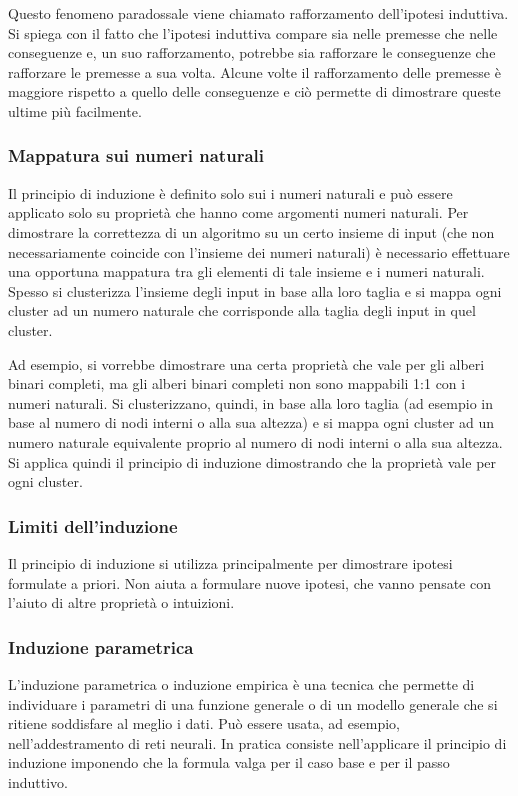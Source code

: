 Questo fenomeno paradossale viene chiamato rafforzamento dell'ipotesi induttiva. Si spiega con il fatto che l'ipotesi
induttiva compare sia nelle premesse che nelle conseguenze e, un suo rafforzamento, potrebbe sia rafforzare le conseguenze
che rafforzare le premesse a sua volta. Alcune volte il rafforzamento delle premesse è maggiore rispetto a quello delle
conseguenze e ciò permette di dimostrare queste ultime più facilmente.

\subsubsection*{Mappatura sui numeri naturali}
Il principio di induzione è definito solo sui i numeri naturali e può essere applicato solo su proprietà che hanno come
argomenti numeri naturali. Per dimostrare la correttezza di un algoritmo su un certo insieme di input (che non necessariamente
coincide con l'insieme dei numeri naturali) è necessario effettuare una opportuna mappatura tra gli elementi di tale insieme
e i numeri naturali. Spesso si clusterizza l'insieme degli input in base alla loro taglia e si mappa ogni cluster ad un numero
naturale che corrisponde alla taglia degli input in quel cluster.

Ad esempio, si vorrebbe dimostrare una certa proprietà che vale per gli alberi binari completi, ma gli alberi binari completi
non sono mappabili 1:1 con i numeri naturali. Si clusterizzano, quindi, in base alla loro taglia (ad esempio in base al numero
di nodi interni o alla sua altezza) e si mappa ogni cluster ad un numero naturale equivalente proprio al numero di nodi interni
o alla sua altezza. Si applica quindi il principio di induzione dimostrando che la proprietà vale per ogni cluster.

\subsubsection*{Limiti dell'induzione}
Il principio di induzione si utilizza principalmente per dimostrare ipotesi formulate a priori. Non aiuta a formulare nuove
ipotesi, che vanno pensate con l'aiuto di altre proprietà o intuizioni.

\subsubsection*{Induzione parametrica}
L'induzione parametrica o induzione empirica è una tecnica che permette di individuare i parametri di una funzione generale
o di un modello generale che si ritiene soddisfare al meglio i dati. Può essere usata, ad esempio, nell'addestramento di
reti neurali. In pratica consiste nell'applicare il principio di induzione imponendo che la formula valga per il caso base
e per il passo induttivo.

